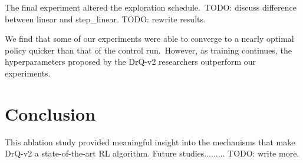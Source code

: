 \documentclass[conference]{./IEEEtran/IEEEtran} %
\begin{document}
    The final experiment altered the exploration schedule.\ TODO: discuss difference between linear and step\_linear.
    TODO: rewrite results.

    We find that some of our experiments were able to converge to a nearly optimal policy quicker than that of the control run.\
    However, as training continues, the hyperparameters proposed by the DrQ-v2 researchers outperform our experiments.

    \section{Conclusion}\label{sec:conclusion}

    This ablation study provided meaningful insight into the mechanisms that make DrQ-v2 a state-of-the-art RL algorithm.
    Future studies......... TODO: write more.

    
    
\end{document}
